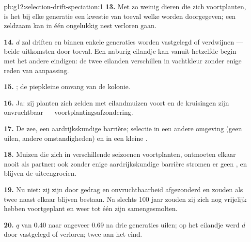 \begin{solution}{pb:g12:selection-drift-speciation:1}
\textbf{13.} Met zo weinig dieren die zich voortplanten, is het bij elke
generatie een kwestie van toeval welke  worden doorgegeven; een
zeldzaam  kan in één ongelukkig nest verloren gaan.

\textbf{14.} $d$ zal driften en binnen enkele generaties worden
vastgelegd of verdwijnen --- beide uitkomsten door toeval. Een naburig
eilandje kan vanuit hetzelfde begin met het andere  eindigen: de twee
eilanden verschillen in vachtkleur zonder enige reden van aanpassing.

\textbf{15.} ; de piepkleine omvang van de kolonie.

\textbf{16.} Ja: zij planten zich zelden met eilandmuizen voort en de
kruisingen zijn onvruchtbaar --- voortplantingsafzondering.

\textbf{17.} De zee, een aardrijkskundige barrière; selectie in een andere
omgeving (geen uilen, andere omstandigheden) en  in een
kleine .

\textbf{18.} Muizen die zich in verschillende seizoenen voortplanten,
ontmoeten elkaar nooit als partner: ook zonder enige aardrijkskundige
barrière stromen er geen , en blijven de  uiteengroeien.

\textbf{19.} Nu niet: zij zijn door gedrag en onvruchtbaarheid afgezonderd
en zouden als twee  naast elkaar blijven bestaan. Na slechts 100
jaar zouden zij zich nog vrijelijk hebben voortgeplant en weer tot één
 zijn samengesmolten.

\textbf{20.} $q$ van 0.40 naar ongeveer 0.69 na drie generaties uilen; op
het eilandje werd $d$ door  vastgelegd of verloren; twee
 aan het eind.
\end{solution}
